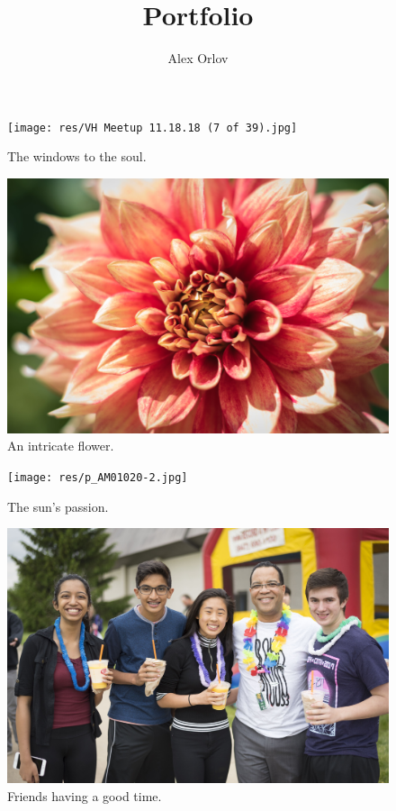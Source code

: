 \documentclass{report}
\title{Portfolio}
\author{Alex Orlov}
\date{}
\begin{document}
\maketitle

\begin{figure}
  \texttt{[image: res/VH Meetup 11.18.18 (7 of 39).jpg]}
  \caption{The windows to the soul.}
\end{figure}

\begin{figure}
  \includegraphics[width=\linewidth]{res/flowermacro.jpg}
  \caption{An intricate flower.}
\end{figure}

\begin{figure}
  \texttt{[image: res/p\_AM01020-2.jpg]}
  \caption{The sun's passion.}
\end{figure}

\begin{figure}
  \includegraphics[width=\linewidth]{res/groupluau.jpg}
  \caption{Friends having a good time.}
\end{figure}
\end{document}
